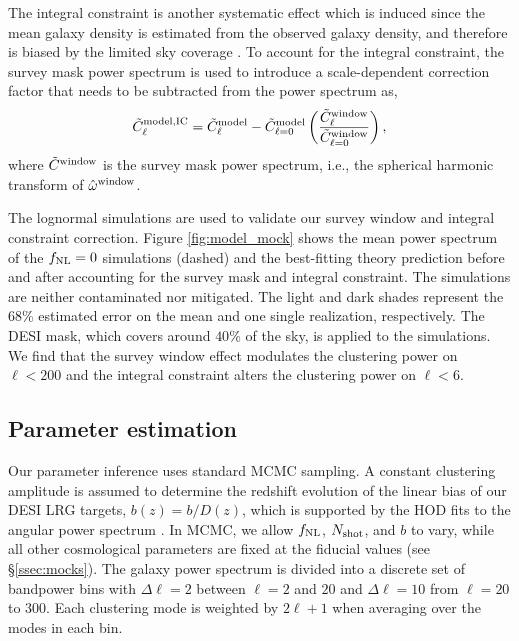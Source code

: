 The integral constraint is another systematic effect which is induced since the mean galaxy density is estimated from the observed galaxy density, and therefore is biased by the limited sky coverage \citep{peacock1991large}. To account for the integral constraint, the survey mask power spectrum is used to introduce a scale-dependent correction factor that needs to be subtracted from the power spectrum as,
\begin{equation}
     \tilde{C}^{\rm model, IC}_{\ell} = \tilde{C}^{\rm model}_{\ell} - \tilde{C}^{\rm model}_{\ell=0} \left(\frac{\tilde{C}^{\rm window}_{\ell}}{\tilde{C}^{\rm window}_{\ell=0}}\right),
\end{equation}
where $\tilde{C}^{\rm window}$ is the survey mask power spectrum, i.e., the spherical harmonic transform of $\hat{\omega}^{\rm window}$.

The lognormal simulations are used to validate our survey window and integral constraint correction. Figure \ref{fig:model_mock} shows the mean power spectrum of the $f_{\rm NL}=0$ simulations (dashed) and the best-fitting theory prediction before and after accounting for the survey mask and integral constraint. The simulations are neither contaminated nor mitigated. The light and dark shades represent the 68\% estimated error on the mean and one single realization, respectively. The DESI mask, which covers around $40\%$ of the sky, is applied to the simulations. We find that the survey window effect modulates the clustering power on $\ell < 200$ and the integral constraint alters the clustering power on $\ell < 6$.

\subsection{Parameter estimation}

Our parameter inference uses standard MCMC sampling. A constant clustering amplitude is assumed to determine the redshift evolution of the linear bias of our DESI LRG targets, $b(z) = b/D(z)$, which is supported by the HOD fits to the angular power spectrum \citep{zhou2021clustering}. In MCMC, we allow $f_{\rm NL}$, $N_{\rm shot}$, and $b$ to vary, while all other cosmological parameters are fixed at the fiducial values (see \S \ref{ssec:mocks}). The galaxy power spectrum is divided into a discrete set of bandpower bins with $\Delta\ell=2$ between $\ell=2$ and $20$ and $\Delta \ell=10$ from $\ell=20$ to $300$. Each clustering mode is weighted by $2\ell+1$ when averaging over the modes in each bin.

